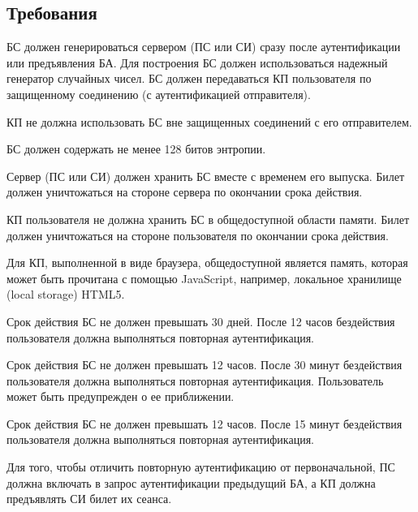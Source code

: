 \subsection{Требования}\label{SM.Reqs}

БС должен генерироваться сервером (ПС или СИ) сразу после аутентификации или 
предъявления БА. Для построения БС должен использоваться надежный генератор 
случайных чисел. БС должен передаваться КП пользователя по защищенному соединению
(с аутентификацией отправителя). 

КП не должна использовать БС вне защищенных соединений с его отправителем. 

БС должен содержать не менее 128 битов энтропии.


Сервер (ПС или СИ) должен хранить БС вместе с временем его выпуска.
Билет должен уничтожаться на стороне сервера по окончании срока действия.

КП пользователя не должна хранить БС в общедоступной области памяти.
Билет должен уничтожаться на стороне пользователя по окончании срока действия.

\begin{note*}
Для КП, выполненной в виде браузера, общедоступной является память,
которая может быть прочитана с помощью JavaScript, например,
локальное хранилище (local storage) HTML5.
%
\end{note*}

Срок действия БС не должен превышать 30 дней.
После 12 часов бездействия пользователя 
должна выполняться повторная аутентификация.

Срок действия БС не должен превышать 12 часов.
После 30 минут бездействия пользователя 
должна выполняться повторная аутентификация.
Пользователь может быть предупрежден о ее приближении.


Срок действия БС не должен превышать 12 часов.
После 15 минут бездействия пользователя 
должна выполняться повторная аутентификация.


Для того, чтобы отличить повторную аутентификацию от первоначальной,
ПС должна включать в запрос аутентификации предыдущий БА,
а КП должна предъявлять СИ билет их сеанса.


